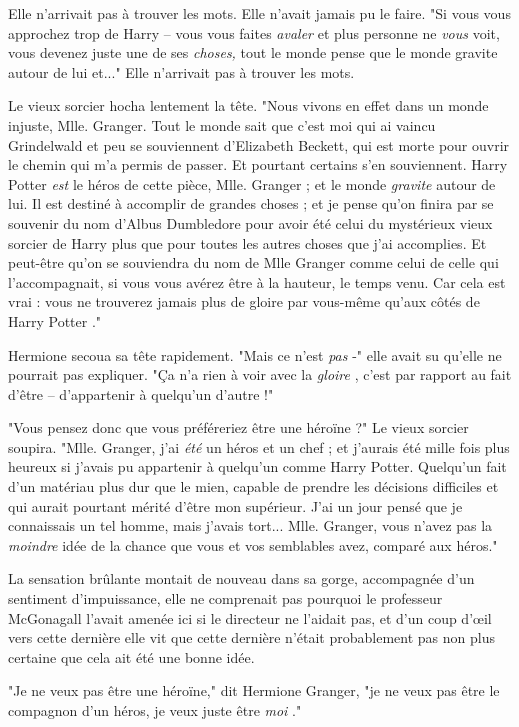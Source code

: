 Elle n'arrivait pas à trouver les mots. Elle n'avait jamais pu le faire. "Si vous vous approchez trop de Harry – vous vous faites \emph{avaler } et plus personne ne \emph{vous}  voit, vous devenez juste une de ses \emph{choses, } tout le monde pense que le monde gravite autour de lui et..." Elle n'arrivait pas à trouver les mots.

Le vieux sorcier hocha lentement la tête. "Nous vivons en effet dans un monde injuste, Mlle. Granger. Tout le monde sait que c'est moi qui ai vaincu Grindelwald et peu se souviennent d'Elizabeth Beckett, qui est morte pour ouvrir le chemin qui m'a permis de passer. Et pourtant certains s'en souviennent. Harry Potter \emph{est}  le héros de cette pièce, Mlle. Granger ; et le monde \emph{gravite } autour de lui. Il est destiné à accomplir de grandes choses ; et je pense qu'on finira par se souvenir du nom d'Albus Dumbledore pour avoir été celui du mystérieux vieux sorcier de Harry plus que pour toutes les autres choses que j'ai accomplies. Et peut-être qu'on se souviendra du nom de Mlle Granger comme celui de celle qui l'accompagnait, si vous vous avérez être à la hauteur, le temps venu. Car cela est vrai : vous ne trouverez jamais plus de gloire par vous-même qu'aux côtés de Harry Potter ."

Hermione secoua sa tête rapidement. "Mais ce n'est \emph{pas}  -" elle avait su qu'elle ne pourrait pas expliquer. "Ça n'a rien à voir avec la \emph{gloire} , c'est par rapport au fait d'être – d'appartenir à quelqu'un d'autre !"

"Vous pensez donc que vous préféreriez être une héroïne ?" Le vieux sorcier soupira. "Mlle. Granger, j'ai \emph{été}  un héros et un chef ; et j'aurais été mille fois plus heureux si j'avais pu appartenir à quelqu'un comme Harry Potter. Quelqu'un fait d'un matériau plus dur que le mien, capable de prendre les décisions difficiles et qui aurait pourtant mérité d'être mon supérieur. J'ai un jour pensé que je connaissais un tel homme, mais j'avais tort... Mlle. Granger, vous n'avez pas la \emph{moindre}  idée de la chance que vous et vos semblables avez, comparé aux héros."

La sensation brûlante montait de nouveau dans sa gorge, accompagnée d'un sentiment d'impuissance, elle ne comprenait pas pourquoi le professeur McGonagall l'avait amenée ici si le directeur ne l'aidait pas, et d'un coup d'œil vers cette dernière elle vit que cette dernière n'était probablement pas non plus certaine que cela ait été une bonne idée.

"Je ne veux pas être une héroïne," dit Hermione Granger, "je ne veux pas être le compagnon d'un héros, je veux juste être \emph{moi} ."

